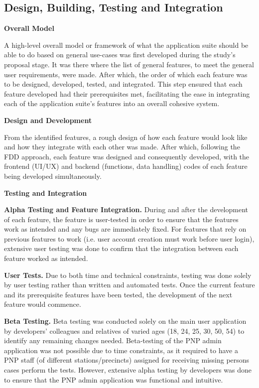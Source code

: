 \subsection{Design, Building, Testing and Integration}

\textbf{Overall Model}

A high-level overall model or framework of what the application suite should be able to do based on general use-cases was first developed during the study’s proposal stage. It was there where the list of general features, to meet the general user requirements, were made. After which, the order of which each feature was to be designed, developed, tested, and integrated. This step ensured that each feature developed had their prerequisites met, facilitating the ease in integrating each of the application suite’s features into an overall cohesive system.

\textbf{Design and Development}

From the identified features, a rough design of how each feature would look like and how they integrate with each other was made. After which, following the FDD approach, each feature was designed and consequently developed, with the frontend (UI/UX) and backend (functions, data handling) codes of each feature being developed simultaneously.

\textbf{Testing and Integration}

\textbf{Alpha Testing and Feature Integration.} During and after the development of each feature, the feature is user-tested in order to ensure that the features work as intended and any bugs are immediately fixed. For features that rely on previous features to work (i.e. user account creation must work before user login), extensive user testing was done to confirm that the integration between each feature worked as intended. 

\textbf{User Tests.} Due to both time and technical constraints, testing was done solely by user testing rather than written and automated tests. Once the current feature and its prerequisite features have been tested, the development of the next feature would commence.

\textbf{Beta Testing.} Beta testing was conducted solely on the main user application by developers’ colleagues and relatives of varied ages (18, 24, 25, 30, 50, 54) to identify any remaining changes needed. Beta-testing of the PNP admin application was not possible due to time constraints, as it required to have a PNP staff (of different stations/precincts) assigned for receiving missing persons cases perform the tests. However, extensive alpha testing by developers was done to ensure that the PNP admin application was functional and intuitive.

